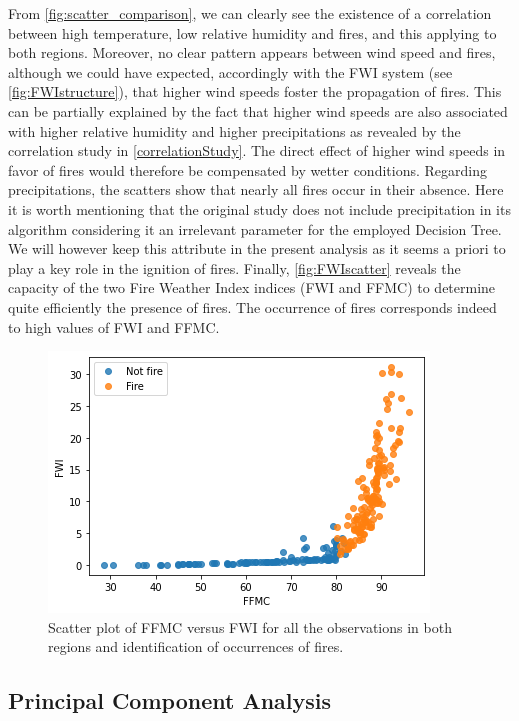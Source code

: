 \documentclass[10pt]{article}
\numberwithin{equation}{section}
\numberwithin{figure}{section}
\numberwithin{table}{section}
\begin{document}
From \autoref{fig:scatter_comparison}, we can clearly see the existence of a correlation between high temperature, low relative humidity and fires, and this applying to both regions. Moreover, no clear pattern appears between wind speed and fires, although we could have expected, accordingly with the FWI system (see \autoref{fig:FWIstructure}), that higher wind speeds foster the propagation of fires. This can be partially explained by the fact that higher wind speeds are also associated with higher relative humidity and higher precipitations as revealed by the correlation study in \autoref{correlationStudy}. The direct effect of higher wind speeds in favor of fires would therefore be compensated by wetter conditions. Regarding precipitations, the scatters show that nearly all fires occur in their absence. Here it is worth mentioning that the original study \cite{article} does not include precipitation in its algorithm considering it an irrelevant parameter for the employed Decision Tree. We will however keep this attribute in the present analysis as it seems a priori to play a key role in the ignition of fires. Finally, \autoref{fig:FWIscatter} reveals the capacity of the two Fire Weather Index indices (FWI and FFMC) to determine quite efficiently the presence of fires. The occurrence of fires corresponds indeed to high values of FWI and FFMC.

\begin{figure} [H]
    \centering
    \includegraphics[scale=0.65]{Figures/FFMCVsFWI_Fires.png}
    \caption{Scatter plot of FFMC versus FWI for all the observations in both regions and identification of occurrences of fires.}
    \label{fig:FWIscatter}
\end{figure}

\subsection{Principal Component Analysis}
\end{document}
